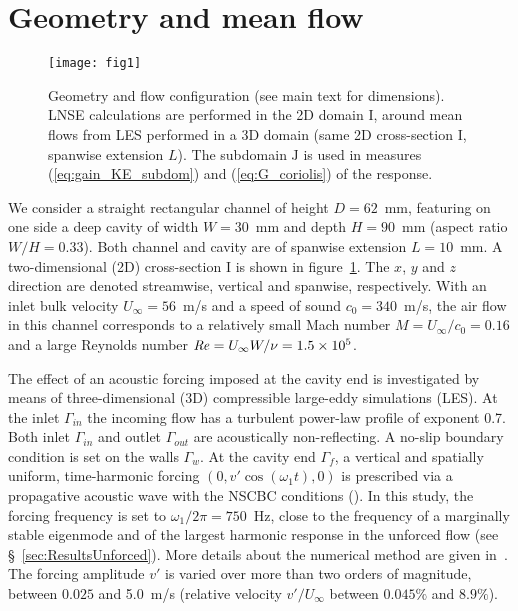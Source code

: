 \documentclass[11pt,onecolumn]{article}
\def\dom    {{\mbox{I}}}
\def\subdom {{\mbox{J}}}
\def\Ubulk  {        U_\infty }
\newcommand\Rey{\mbox{\textit{Re}}}
\begin{document}
%
\section{Geometry and mean flow}
\label{sec:Mean}


\begin{figure}[] %
\centerline{
\texttt{[image: fig1]} 
} 
\vspace{-0.2cm}
\caption{
Geometry and flow configuration (see main text for dimensions). 
LNSE calculations are performed in the 2D domain $\dom$, around mean flows from LES performed in a 3D domain (same 2D cross-section $\dom$, spanwise extension $L$). 
The subdomain $\subdom$ is used in  measures (\ref{eq:gain_KE_subdom}) and (\ref{eq:G_coriolis}) of the response.
} 
\label{fig:geom}
\end{figure}


We consider a straight rectangular channel of height $D=62$~mm, featuring on one side a deep cavity of width $W=30$~mm and depth $H=90$~mm (aspect ratio $W/H=0.33$).
Both channel and cavity are of 
spanwise extension $L=10$~mm.
A two-dimensional (2D) cross-section $\dom$ is shown in figure~\ref{fig:geom}.
The $x$, $y$ and $z$ direction are denoted streamwise, vertical and spanwise, respectively.
With an inlet bulk velocity $\Ubulk=56$~m/s and a speed of sound $c_0=340$~m/s, the air flow in this channel corresponds to a relatively small Mach number $M=\Ubulk/c_0=0.16$ and a large Reynolds number $\Rey = \Ubulk W/\nu = 1.5\times10^5$.

The effect of an acoustic forcing imposed at the cavity end is investigated by means of three-dimensional (3D) compressible large-eddy simulations (LES). 
At the inlet $\Gamma_{in}$ the incoming flow has a turbulent power-law profile of exponent 0.7.
Both inlet $\Gamma_{in}$ and outlet $\Gamma_{out}$ are acoustically non-reflecting.
A no-slip boundary condition is set on the walls $\Gamma_w$.
At the cavity end $\Gamma_{f}$, a vertical and spatially uniform, time-harmonic forcing $(0,v'\cos(\omega_1 t),0)$ is prescribed via a propagative acoustic wave with the NSCBC conditions (\cite{Poinsot92}).
In this study, the forcing frequency is set to $\omega_1/2\pi=750$~Hz, close to the frequency of a marginally stable eigenmode  and of the largest harmonic response in the unforced flow (see \S~\ref{sec:ResultsUnforced}).
More details about the numerical method are given in~\cite{Bauerheim17}.
The forcing amplitude $v'$ is varied  over more than two orders of magnitude, between $0.025$ and 5.0~m/s (relative velocity $v'/\Ubulk$ between $0.045\%$ and $8.9\%$).
\end{document}
